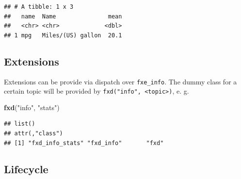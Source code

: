 \documentclass[]{report}
\newenvironment{Shaded}{\begin{snugshade}}{\end{snugshade}}
\newcommand{\KeywordTok}[1]{\textcolor[rgb]{0.13,0.29,0.53}{\textbf{#1}}}
\newcommand{\DataTypeTok}[1]{\textcolor[rgb]{0.13,0.29,0.53}{#1}}
\newcommand{\DecValTok}[1]{\textcolor[rgb]{0.00,0.00,0.81}{#1}}
\newcommand{\StringTok}[1]{\textcolor[rgb]{0.31,0.60,0.02}{#1}}
\newcommand{\ControlFlowTok}[1]{\textcolor[rgb]{0.13,0.29,0.53}{\textbf{#1}}}
\newcommand{\OperatorTok}[1]{\textcolor[rgb]{0.81,0.36,0.00}{\textbf{#1}}}
\newcommand{\NormalTok}[1]{#1}
\theoremstyle{definition}
\theoremstyle{definition}
\theoremstyle{definition}
\theoremstyle{remark}
\begin{document}
\begin{Shaded}
\end{Shaded}

\begin{verbatim}
## # A tibble: 1 x 3
##   name  Name               mean
##   <chr> <chr>             <dbl>
## 1 mpg   Miles/(US) gallon  20.1
\end{verbatim}

\subsection{Extensions}\label{extensions-1}

Extensions can be provide via dispatch over \texttt{fxe\_info}. The
dummy class for a certain topic will be provided by
\texttt{fxd("info",\ \textless{}topic\textgreater{})}, e. g.

\begin{Shaded}
\begin{Highlighting}[]
\KeywordTok{fxd}\NormalTok{(}\StringTok{"info"}\NormalTok{, }\StringTok{"stats"}\NormalTok{)}
\end{Highlighting}
\end{Shaded}

\begin{verbatim}
## list()
## attr(,"class")
## [1] "fxd_info_stats" "fxd_info"       "fxd"
\end{verbatim}

\subsection{Lifecycle}\label{lifecycle-1}
\end{document}
